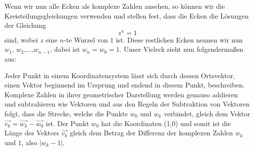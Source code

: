\documentclass[a4paper,12pt]{article} %
\begin{document}
\begin{figure}
\begin{center}
		
	\end{center}
\end{figure}

Wenn wir nun alle Ecken als komplexe Zahlen ansehen, so können wir die Kreisteilungsgleichungen verwenden und stellen fest, dass die Ecken die Lösungen der Gleichung
\begin{equation}
	z^n=1
\end{equation}
sind, wobei $z$ eine $n$-te Wurzel von $1$ ist.
Diese restlichen Ecken nennen wir nun $w_1$, $w_2$,$\dots$,$w_{n-1}$, dabei ist $w_n = w_0 = 1$.
Unser Vieleck sieht nun folgendermaßen aus:






Jeder Punkt in einem Koordinatensystem lässt sich durch dessen Ortsvektor, einen Vektor beginnend im Ursprung und endend in diesem Punkt, beschreiben. Komplexe Zahlen in ihrer geometrischer Darstellung werden genauso addieren und subtrahieren wie Vektoren und aus den Regeln der Subtraktion von Vektoren folgt, dass die Strecke, welche die Punkte $w_0$ und $w_k$ verbindet, gleich dem Vektor $\vec{v_k}=\vec{w_k}-\vec{w_0}$ ist.
Der Punkt $w_0$ hat die Koordinaten (1,0) und somit ist die Länge des Vektors $\vec{v_k}$ gleich dem Betrag der Differenz der komplexen Zahlen $w_k$ und $1$, also $|w_k-1|$.
\end{document}
